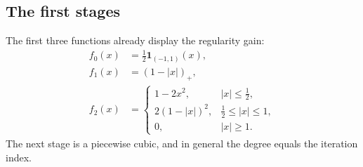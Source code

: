 \documentclass[11pt,oneside]{article}
\theoremstyle{definition}
\theoremstyle{remark}
\newcommand{\pos}[1]{\left(#1\right)_{+}}
\begin{document}
\subsection{The first stages}

The first three functions already display the regularity gain:
\begin{align}
 f_0(x)&=\frac12\mathbf 1_{(-1,1)}(x),                                      \label{eq:f0}\\
 f_1(x)&=\pos{1-|x|},                                                        \label{eq:f1}\\
 f_2(x)&=
 \begin{cases}
  1-2x^2,&|x|\le\tfrac12,\\
  2(1-|x|)^2,&\tfrac12\le|x|\le1,\\
  0,&|x|\ge1.
 \end{cases}                                                               \label{eq:f2}
\end{align}
The next stage is a piecewise cubic, and in general the degree equals the iteration index.
\end{document}

